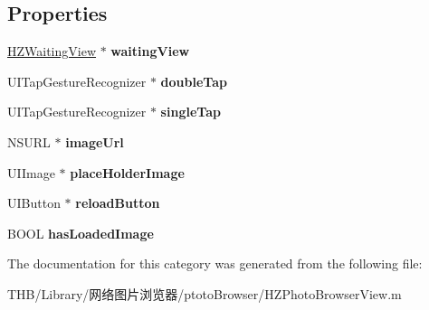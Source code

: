 \subsection*{Properties}
\begin{DoxyCompactItemize}
\item 
\mbox{\label{category_h_z_photo_browser_view_07_08_a4075bd4037b30c8703de964c7cccea05}} 
\mbox{\hyperlink{interface_h_z_waiting_view}{H\+Z\+Waiting\+View}} $\ast$ {\bfseries waiting\+View}
\item 
\mbox{\label{category_h_z_photo_browser_view_07_08_af43425579d7ce4619dbf611871f62392}} 
U\+I\+Tap\+Gesture\+Recognizer $\ast$ {\bfseries double\+Tap}
\item 
\mbox{\label{category_h_z_photo_browser_view_07_08_a135bf3ff0f098d2234568447ef3c08c7}} 
U\+I\+Tap\+Gesture\+Recognizer $\ast$ {\bfseries single\+Tap}
\item 
\mbox{\label{category_h_z_photo_browser_view_07_08_abbcda2c77e5533c8a714d12dd2c5935a}} 
N\+S\+U\+RL $\ast$ {\bfseries image\+Url}
\item 
\mbox{\label{category_h_z_photo_browser_view_07_08_ac38719e0f0fdfde99363eef045fea18d}} 
U\+I\+Image $\ast$ {\bfseries place\+Holder\+Image}
\item 
\mbox{\label{category_h_z_photo_browser_view_07_08_a3762e320fc3d7ee070901137bec52196}} 
U\+I\+Button $\ast$ {\bfseries reload\+Button}
\item 
\mbox{\label{category_h_z_photo_browser_view_07_08_a6821e475fc5eb898a13f91e17f46d8d8}} 
B\+O\+OL {\bfseries has\+Loaded\+Image}
\end{DoxyCompactItemize}


The documentation for this category was generated from the following file\+:\begin{DoxyCompactItemize}
\item 
T\+H\+B/\+Library/网络图片浏览器/ptoto\+Browser/H\+Z\+Photo\+Browser\+View.\+m\end{DoxyCompactItemize}

